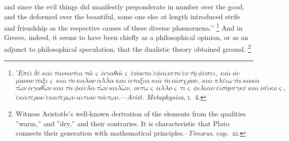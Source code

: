 \documentclass[oneside]{book}
\begin{document}
and since the evil things did manifestly preponderate in number
over the good, and the deformed over the beautiful, some one
else at length introduced strife and friendship as the respective
causes of these diverse ph{\ae}nornena.\rq\rq%
\footnote{'$E\pi\varepsilon\grave{\iota}\ \delta\grave{\varepsilon}\ \kappa\alpha\grave{\iota}\ \tau\grave{\alpha}\nu\alpha\nu\tau\acute{\iota}\alpha\ \tau{o}\tilde{\iota}\varsigma\ \acute{\alpha}\gamma\alpha\theta{o}\tilde{\iota}\varsigma\ \acute{\varepsilon}\nu\acute{o}\nu\tau\alpha\ \acute{\varepsilon}\phi\alpha\acute{\iota}\nu\varepsilon\tau{o}\ \acute{\varepsilon}\nu\ \tau\tilde{\eta}\ \phi\acute{\upsilon}\sigma\varepsilon\iota,\ \kappa\alpha\grave{\iota}\ {o}\acute{\upsilon}
$ $
\mu\acute{o}\nu{o}\nu\ \tau\acute{\alpha}\xi\iota\varsigma\ \kappa\alpha\grave{\iota}\ \tau\grave{o}\ \kappa\alpha\lambda\grave{o}\nu\ \acute{\alpha}\lambda\lambda\grave{\alpha}\ \kappa\alpha\grave{\iota}\ \acute{\alpha}\tau\alpha\xi\acute{\iota}\alpha\ \kappa\alpha\grave{\iota}\ \tau\grave{o}\ \alpha\acute{\iota}\sigma\chi\rho\acute{o}\nu,\ \kappa\alpha\grave{\iota}\ \pi\lambda\varepsilon\acute{\iota}\omega\ \tau\grave{\alpha}\ \kappa\alpha\kappa\grave{\alpha}\
$ $
\tau\tilde{\omega}\nu\ \acute{\alpha}\gamma\alpha\theta\tilde{\omega}\nu\ \kappa\alpha\grave{\iota}\ \tau\grave{\alpha}\ \phi\alpha\tilde{\upsilon}\lambda\alpha\ \tau\tilde{\omega}\nu\ \kappa\alpha\lambda\tilde{\omega}\nu,\ {o}\ddot{\upsilon}\tau\omega\varsigma\ \ddot{\alpha}\lambda\lambda{o}\varsigma\ \tau\iota\varsigma\ \phi\iota\lambda\acute{\iota}\alpha\nu\ \varepsilon\acute{\iota}\sigma\acute{\eta}\nu\varepsilon\gamma\kappa%
\varepsilon\ \kappa\alpha\grave{\iota}\ \nu\varepsilon\tilde{\iota}\kappa{o}\varsigma,
$ $
\grave{\varepsilon}\kappa\acute{\alpha}\tau\varepsilon\rho{o}\nu\ \grave{\varepsilon}\kappa\alpha\tau\acute{\varepsilon}\rho\omega\nu\ \alpha\ddot{\iota}\tau\iota{o}\nu\ \tau{o}\acute{\upsilon}\tau\omega\nu.
$---\textit{Arist. Metaphysica}, \textsc{i.}~4.
%
}%
And in Greece, indeed,
it seems to have been chiefly as a philosophical opinion, or as an
adjunct to philosophical speculation, that the dualistic theory obtained ground.%
\footnote{Witness Aristotle's well-known derivation of the elements from the
qualities ''warm,'' and ''dry,'' and their contraries. It is characteristic that Plato
connects their generation with mathematical
principles.--\emph{Tim\ae us}, cap.~xi.}%
\end{document}

